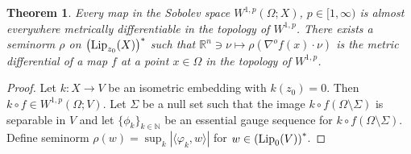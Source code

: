 \documentclass[reqno]{amsart}
\newtheorem{thm}{Theorem}[section]
\begin{document}
\begin{thm}\label{theorem:metricSob}
Every map in the Sobolev space 
$W^{1,p}(\Omega; X)$, $p\in [1, \infty)$
is almost everywhere metrically differentiable in the topology of $W^{1,p}$.
There exists a seminorm $\rho$ on $\left(\textnormal{Lip}_{z_0}(X)\right)^*$ such that  
  $\mathbb R^n \ni \nu\mapsto \rho(\nabla^of(x)\cdot\nu ) $
is the metric differential of a map $f$
at a point $x\in\Omega$ in the topology of $W^{1,p}$. 
\end{thm}
\begin{proof}
Let $k:X\to V$ be an isometric embedding with $k(z_0)=0$. Then $k\circ f \in W^{1,p}(\Omega; V)$.
Let $\Sigma$ be a null set such that the image $k\circ f(\Omega\setminus\Sigma)$ is separable in $V$ and let $\{\phi_k\}_{k\in\mathbb N}$ be an essential gauge sequence for 
$k\circ f(\Omega\setminus\Sigma)$.
Define seminorm
$
\rho(w) = \sup_k|  \langle \varphi_k, w \rangle|
$
for $w\in \left(\textnormal{Lip}_{0}(V)\right)^*$.


\end{proof}
\end{document}
